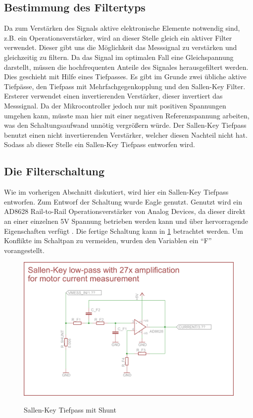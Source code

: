 \subsection{Bestimmung des Filtertyps}
Da zum Verstärken des Signals aktive elektronische Elemente notwendig sind, z.B. ein Operationsverstärker, wird an dieser Stelle gleich ein aktiver Filter verwendet. 
Dieser gibt uns die Möglichkeit das Messsignal zu verstärken und gleichzeitig zu
filtern. Da das Signal im optimalen Fall eine Gleichspannung darstellt, müssen die hochfrequenten Anteile des Signales herausgefiltert werden. Dies geschieht 
mit Hilfe eines Tiefpasses. Es gibt im Grunde zwei übliche aktive Tiefpässe, den Tiefpass mit Mehrfachgegenkopplung und den Sallen-Key Filter. Ersterer verwendet
einen invertierenden Verstärker, dieser invertiert das Messsignal. Da der Mikrocontroller jedoch nur mit positiven Spannungen umgehen kann, müsste man hier mit einer 
negativen Referenzspannung arbeiten, was den Schaltungsaufwand unnötig vergrößern würde. Der Sallen-Key Tiefpass benutzt einen nicht invertierenden Verstärker, welcher diesen
Nachteil nicht hat. Sodass ab dieser Stelle ein Sallen-Key Tiefpass entworfen wird.


\subsection{Die Filterschaltung}

Wie im vorherigen Abschnitt diskutiert, wird hier ein Sallen-Key Tiefpass entworfen. Zum Entworf der Schaltung wurde Eagle genutzt.
Genutzt wird ein AD8628  Rail-to-Rail Operationsverstärker von Analog Devices, da dieser direkt an einer einzelnen 5V Spannung betrieben werden kann und
über hervorragende Eigenschaften verfügt \cite{ds-opv}. Die fertige Schaltung kann in \cref{fig:fschalt} betrachtet werden. Um Konflikte im Schaltpan zu vermeiden,
wurden den Variablen ein ``F'' vorangestellt.
\begin{figure}[H]
\centering
\includegraphics[width=\textwidth]{filter_schaltung.png}\\
\caption{Sallen-Key Tiefpass mit Shunt}%
\label{fig:fschalt}
\end{figure}



